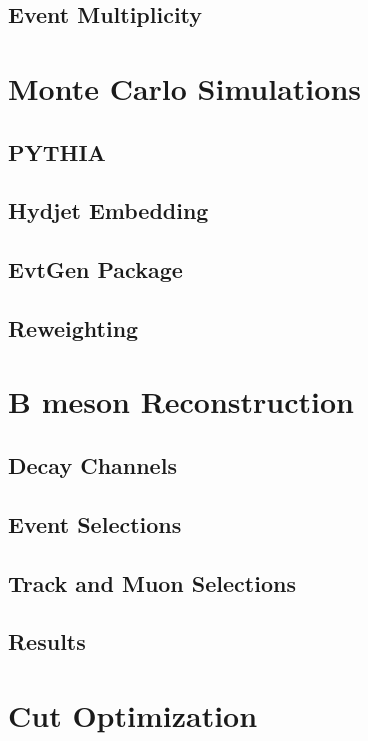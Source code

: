 \subsection{Event Multiplicity}

\section{Monte Carlo Simulations} 

\subsection{PYTHIA}

\subsection{Hydjet Embedding}

\subsection{EvtGen Package}

\subsection{Reweighting}

\section{B meson Reconstruction} 

\subsection{Decay Channels}

\subsection{Event Selections}

\subsection{Track and Muon Selections}

\subsection{Results}

\section{Cut Optimization} 

